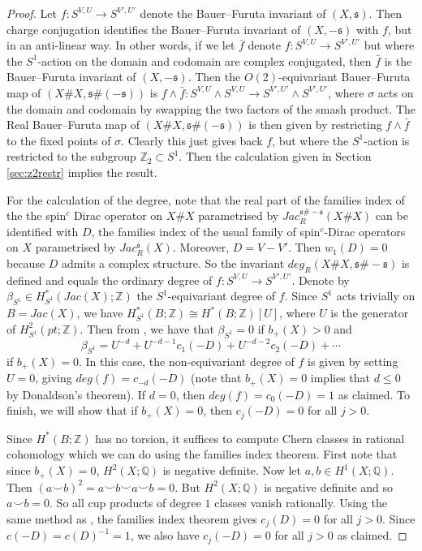 \documentclass{amsart}
\theoremstyle{definition}
\theoremstyle{remark}
\numberwithin{equation}{section}
\begin{document}
\begin{proof}
Let $f : S^{V,U} \to S^{V',U'}$ denote the Bauer--Furuta invariant of $(X , \mathfrak{s})$. Then charge conjugation identifies the Bauer--Furuta invariant of $(X, -\mathfrak{s})$ with $f$, but in an anti-linear way. In other words, if we let $\bar{f}$ denote $f : S^{V,U} \to S^{V',U'}$ but where the $S^1$-action on the domain and codomain are complex conjugated, then $\bar{f}$ is the Bauer--Furuta invariant of $(X , -\mathfrak{s})$. Then the $O(2)$-equivariant Bauer--Furuta map of $(X \# X , \mathfrak{s} \# (-\mathfrak{s}) )$ is $f \wedge \bar{f} : S^{V,U} \wedge S^{V,U} \to S^{V',U'} \wedge S^{V',U'}$, where $\sigma$ acts on the domain and codomain by swapping the two factors of the smash product. The Real Bauer--Furuta map of $(X \# X , \mathfrak{s} \# (-\mathfrak{s}))$ is then given by restricting $f \wedge \bar{f}$ to the fixed points of $\sigma$. Clearly this just gives back $f$, but where the $S^1$-action is restricted to the subgroup $\mathbb{Z}_2 \subset S^1$. Then the calculation given in Section \ref{sec:z2restr} implies the result.

For the calculation of the degree, note that the real part of the families index of the the spin$^c$ Dirac operator on $X \# X$ parametrised by $Jac_R^{\mathfrak{s} \# -\mathfrak{s}}(X \# X)$ can be identified with $D$, the families index of the usual family of spin$^c$-Dirac operators on $X$ parametrised by $Jac_R^{\mathfrak{s}}(X)$. Moreover, $D = V - V'$. Then $w_1(D) = 0$ because $D$ admits a complex structure. So the invariant $deg_R(X \# X , \mathfrak{s} \# -\mathfrak{s})$ is defined and equals the ordinary degree of $f : S^{V,U} \to S^{V',U'}$. Denote by $\beta_{S^1} \in H^*_{S^1}( Jac(X) ; \mathbb{Z})$ the $S^1$-equivariant degree of $f$. Since $S^1$ acts trivially on $B = Jac(X)$, we have $H^*_{S^1}(B ; \mathbb{Z}) \cong H^*(B ; \mathbb{Z})[U]$, where $U$ is the generator of $H^2_{S^1}(pt ; \mathbb{Z})$. Then from \cite[]{bar}, we have that $\beta_{S^1} = 0$ if $b_+(X) > 0$ and
\[
\beta_{S^1} = U^{-d} + U^{-d-1} c_1(-D) + U^{-d-2} c_2(-D) + \cdots
\]
if $b_+(X) = 0$. In this case, the non-equivariant degree of $f$ is given by setting $U=0$, giving $deg(f) = c_{-d}(-D)$ (note that $b_+(X) = 0$ implies that $d \le 0$ by Donaldson's theorem). If $d=0$, then $deg(f) = c_0(-D) = 1$ as claimed. To finish, we will show that if $b_+(X) = 0$, then $c_j(-D) = 0$ for all $j > 0$.

Since $H^*(B ; \mathbb{Z})$ has no torsion, it suffices to compute Chern classes in rational cohomology which we can do using the families index theorem. First note that since $b_+(X) = 0$, $H^2(X ; \mathbb{Q})$ is negative definite. Now let $a,b \in H^1(X ; \mathbb{Q})$. Then $(a \smallsmile b )^2 = a \smallsmile b \smallsmile a \smallsmile b = 0$. But $H^2(X ; \mathbb{Q})$ is negative definite and so $a \smallsmile b = 0$. So all cup products of degree $1$ classes vanish rationally. Using the same method as \cite[]{bk}, the families index theorem gives $c_j(D) = 0$ for all $j > 0$. Since $c(-D) = c(D)^{-1}=1$, we also have $c_j(-D) = 0$ for all $j >0$ as claimed.
\end{proof}
\end{document}
